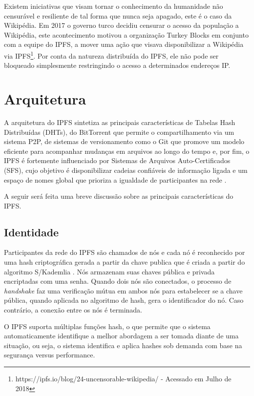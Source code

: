 \documentclass[tcc,capa]{texufpel}
\begin{document}
    Existem iniciativas que visam tornar o conhecimento da humanidade não censurável e resiliente de tal forma que nunca seja apagado, este é o caso da Wikipédia. Em 2017 o governo turco decidiu censurar o acesso da população a Wikipédia, este acontecimento motivou a organização Turkey Blocks em conjunto com a equipe do IPFS, a mover uma ação que visava disponibilizar a Wikipédia via IPFS\footnote{https://ipfs.io/blog/24-uncensorable-wikipedia/ - Acessado em Julho de 2018}. Por conta da natureza distribuída do IPFS, ele não pode ser bloqueado simplesmente restringindo o acesso a determinados endereços IP.

	\section{Arquitetura}
	    
        A arquitetura do IPFS sintetiza as principais características de Tabelas Hash Distribuídas (DHTs), do BitTorrent que permite o compartilhamento via um sistema P2P, de sistemas de versionamento como o Git que promove um modelo eficiente para acompanhar mudanças em arquivos ao longo do tempo e, por fim, o IPFS é fortemente influenciado por Sistemas de Arquivos Auto-Certificados (SFS), cujo objetivo é disponibilizar cadeias confiáveis de informação ligada e um espaço de nomes global que prioriza a igualdade de participantes na rede \cite{benet2014ipfs}.
        
        A seguir será feita uma breve discussão sobre as principais características do IPFS.
    
    \subsection{Identidade}
    	
    	Participantes da rede do IPFS são chamados de nós e cada nó é reconhecido por uma hash criptográfica gerada a partir da chave publica que é criada a partir do algoritmo S/Kademlia \cite{benet2014ipfs}. Nós armazenam suas chaves pública e privada encriptadas com uma senha. Quando dois nós são conectados, o processo de \textit{handshake} faz uma verificação mútua em ambos nós para estabelecer se a chave pública, quando aplicada no algoritmo de hash, gera o identificador do nó. Caso contrário, a conexão entre os nós é terminada.
    	
    	O IPFS suporta múltiplas funções hash, o que permite que o sistema automaticamente identifique a melhor abordagem a ser tomada diante de uma situação, ou seja, o sistema identifica e aplica hashes sob demanda com base na segurança versus performance.
        
\end{document}
